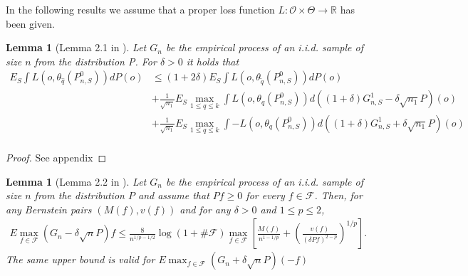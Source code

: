 \documentclass[11pt, a4paper]{article}
\newtheorem{lemma}[theorem]{Lemma}
\theoremstyle{definition}
\theoremstyle{remark}
\newcommand{\cl}{q}
\begin{document}
In the following results we assume that a proper loss function $ L: \mathcal{O} \times \Theta \to \mathbb{R} $ has been given.  
\begin{lemma}[Lemma 2.1 in \cite{vaart06}] \label{finitesampledecomp}
    Let $ G_{n} $ be the empirical process of an i.i.d. sample of size $ n $ from the distribution P. For $ \delta > 0 $ it holds that
   \begin{align*}
       E_{S} \int L(o, \theta_{ \hat{\cl}}(P_{n, S}^{0})) dP(o) &\leq (1 + 2 \delta) E_{S} \int L(o, \theta_{ \tilde{\cl} }(P_{n, S}^{0})) d P(o) \\ 
                                                                &+\frac{1}{\sqrt{n_1} } E_{S} \max_{1 \leq \cl \leq k} \int L(o, \theta_{\cl}(P_{n, S}^{0})) d ((1 + \delta) G_{n,S}^{1} - \delta \sqrt{n_1} P)(o)  \\
                                                                &+\frac{1}{\sqrt{n_1} } E_{S} \max_{1 \leq \cl \leq k} \int-L(o, \theta_{\cl}(P_{n, S}^{0})) d ((1 + \delta) G_{n,S}^{1} + \delta \sqrt{n_1} P)(o)  \\
   \end{align*}
\end{lemma}
\begin{proof}
    See appendix
\end{proof}

\begin{lemma}[Lemma 2.2 in \cite{vaart06}] \label{finitesamplebound}
    Let $G_{n}$ be the empirical process of an i.i.d. sample of size $n$ from the distribution $P$ and assume that $P f \geq 0$ for every $f \in \mathcal{F}$. Then, for any Bernstein pairs $(M(f), v(f))$ and for any $\delta>0$ and $1 \leq p \leq 2$,
    \begin{align*}
    E \max_{f \in \mathcal{F}}(G_n-\delta \sqrt{n} P) f \leq \frac{8}{n^{1 / p-1 / 2}} \log (1+\# \mathcal{F}) \max _{f \in \mathcal{F}}\left[\frac{M(f)}{n^{1-1 / p}}+\left(\frac{v(f)}{(\delta P f)^{2-p}}\right)^{1 / p}\right].
    \end{align*}
    The same upper bound is valid for $ E \max_{f \in \mathcal{F}}(G_n+\delta \sqrt{n} P)(-f) $  
\end{lemma}
\end{document}
